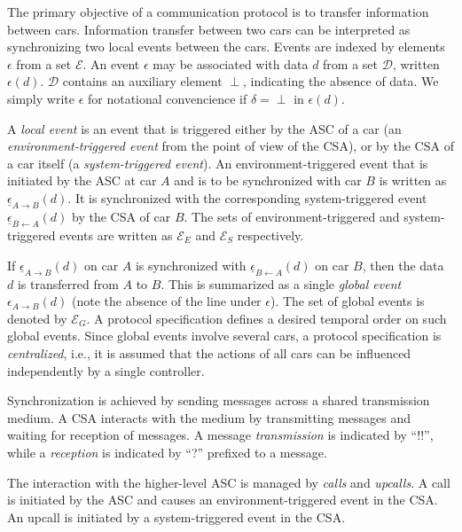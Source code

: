 \documentclass{sig-alternate}
\newcommand{\e}{\epsilon}
\renewcommand{\d}{\delta}
\newcommand{\D}{\mathcal{D}}
\newcommand{\E}{\mathcal{E}}
\newcommand{\SE}{\mathcal{E}_S}
\newcommand{\EE}{\mathcal{E}_E}
\newcommand{\G}{\mathcal{E}_G}
\newcommand{\locev}[1]{\underline{#1}}
\newcommand{\glob}[4]{{#1}_{{#2} \rightarrow {#3}}(#4)}
\newcommand{\env}[4]{\locev{#1}_{{#2} \rightarrow {#3}}(#4)}
\newcommand{\sys}[4]{\locev{#1}_{{#2} \leftarrow {#3}}(#4)}
\newcommand{\define}{\sl}
\begin{document}
The primary objective of a communication protocol is to transfer information between cars. Information transfer between two cars can be interpreted as synchronizing two local events between the cars. Events are indexed by elements $\e$ from a set $\E$. An event $\e$ may be associated with data $d$ from a set $\D$, written $\e(d)$. $\D$ contains an auxiliary element $\perp$, indicating the absence of data. We simply write $\e$ for notational convencience if $\d = \perp$ in $\e(d)$.

A {\define local event} is an event that is triggered either by the ASC of a car (an {\define environment-triggered event} from the point of view of the CSA), or by the CSA of a car itself (a {\define system-triggered event}). An environment-triggered event that is initiated by the ASC at car $A$ and is to be synchronized with car $B$ is written as $\env{\e}{A}{B}{d}$. It is synchronized with the corresponding system-triggered event $\sys{\e}{B}{A}{d}$ by the CSA of car $B$. The sets of environment-triggered and system-triggered events are written as $\EE$ and $\SE$ respectively.

If $\env{\e}{A}{B}{d}$ on car $A$ is synchronized with $\sys{\e}{B}{A}{d}$ on car $B$, then the data $d$ is transferred from $A$ to $B$. This is summarized as a single {\define global event} $\glob{\e}{A}{B}{d}$ (note the absence of the line under $\e$). The set of global events is denoted by $\G$. A protocol specification defines a desired temporal order on such global events. Since global events involve several cars, a protocol specification is {\define centralized}, i.e., it is assumed that the actions of all cars can be influenced independently by a single controller.

Synchronization is achieved by sending messages across a shared transmission medium. A CSA interacts with the medium by transmitting messages and waiting for reception of messages. A message {\define transmission} is indicated by ``$!!$'', while a {\define reception} is indicated by ``?'' prefixed to a message.

The interaction with the higher-level ASC is managed by {\define calls} and {\define upcalls}.  A call is initiated by the ASC and causes an environment-triggered event in the CSA. An upcall is initiated by a system-triggered event in the CSA.
\end{document}
